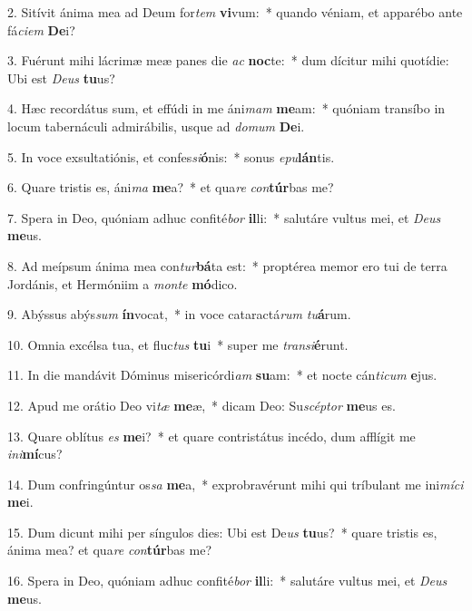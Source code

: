 2. Sitívit ánima mea ad Deum for\textit{tem} \textbf{vi}vum:~*  quando véniam, et apparébo ante fá\textit{ci}\textit{em} \textbf{De}i?\

3. Fuérunt mihi lácrimæ meæ panes die \textit{ac} \textbf{noc}te:~*  dum dícitur mihi quotídie: Ubi est \textit{De}\textit{us} \textbf{tu}us?\

4. Hæc recordátus sum, et effúdi in me áni\textit{mam} \textbf{me}am:~*  quóniam transíbo in locum tabernáculi admirábilis, usque ad \textit{do}\textit{mum} \textbf{De}i.\

5. In voce exsultatiónis, et confes\textit{si}\textbf{ó}nis:~*  sonus \textit{e}\textit{pu}\textbf{lán}tis.\

6. Quare tristis es, áni\textit{ma} \textbf{me}a?~*  et qua\textit{re} \textit{con}\textbf{túr}bas me?\

7. Spera in Deo, quóniam adhuc confité\textit{bor} \textbf{il}li:~*  salutáre vultus mei, et \textit{De}\textit{us} \textbf{me}us.\

8. Ad meípsum ánima mea con\textit{tur}\textbf{bá}ta est:~*  proptérea memor ero tui de terra Jordánis, et Hermóniim a \textit{mon}\textit{te} \textbf{mó}dico.\

9. Abýssus abýs\textit{sum} \textbf{ín}vocat,~*  in voce cataractá\textit{rum} \textit{tu}\textbf{á}rum.\

10. Omnia excélsa tua, et fluc\textit{tus} \textbf{tu}i~*  super me \textit{trans}\textit{i}\textbf{é}runt.\

11. In die mandávit Dóminus misericórdi\textit{am} \textbf{su}am:~*  et nocte cán\textit{ti}\textit{cum} \textbf{e}jus.\

12. Apud me orátio Deo vi\textit{tæ} \textbf{me}æ,~*  dicam Deo: Su\textit{scép}\textit{tor} \textbf{me}us es.\

13. Quare oblítus \textit{es} \textbf{me}i?~*  et quare contristátus incédo, dum afflígit me \textit{in}\textit{i}\textbf{mí}cus?\

14. Dum confringúntur os\textit{sa} \textbf{me}a,~*  exprobravérunt mihi qui tríbulant me ini\textit{mí}\textit{ci} \textbf{me}i.\

15. Dum dicunt mihi per síngulos dies: Ubi est De\textit{us} \textbf{tu}us?~*  quare tristis es, ánima mea? et qua\textit{re} \textit{con}\textbf{túr}bas me?\

16. Spera in Deo, quóniam adhuc confité\textit{bor} \textbf{il}li:~*  salutáre vultus mei, et \textit{De}\textit{us} \textbf{me}us.\

